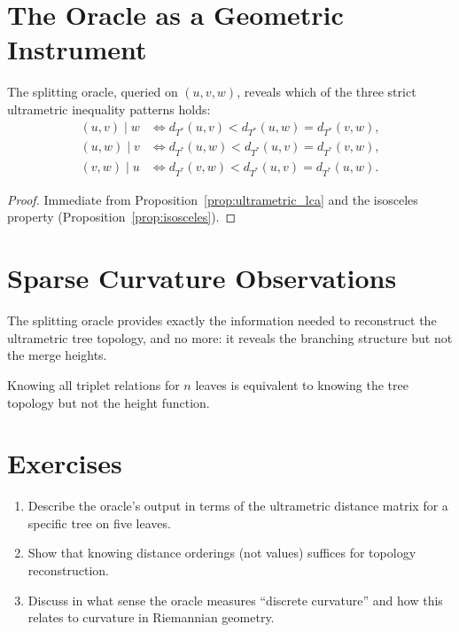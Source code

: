 \section{The Oracle as a Geometric Instrument}

\begin{theorem}
The splitting oracle, queried on $(u,v,w)$, reveals which of the three strict ultrametric inequality patterns holds:
\begin{align*}
(u,v) \mid w &\iff d_{T^*}(u,v) < d_{T^*}(u,w) = d_{T^*}(v,w),\\
(u,w) \mid v &\iff d_{T^*}(u,w) < d_{T^*}(u,v) = d_{T^*}(v,w),\\
(v,w) \mid u &\iff d_{T^*}(v,w) < d_{T^*}(u,v) = d_{T^*}(u,w).
\end{align*}
\end{theorem}

\begin{proof}
Immediate from Proposition~\ref{prop:ultrametric_lca} and the isosceles property (Proposition~\ref{prop:isosceles}).
\end{proof}

\section{Sparse Curvature Observations}

\begin{corollary}
The splitting oracle provides exactly the information needed to reconstruct the ultrametric tree topology, and no more: it reveals the branching structure but not the merge heights.
\end{corollary}

Knowing all triplet relations for $n$ leaves is equivalent to knowing the tree topology but not the height function.

\section{Exercises}

\begin{enumerate}
  \item Describe the oracle's output in terms of the ultrametric distance matrix for a specific tree on five leaves.
  \item Show that knowing distance orderings (not values) suffices for topology reconstruction.
  \item Discuss in what sense the oracle measures ``discrete curvature'' and how this relates to curvature in Riemannian geometry.
\end{enumerate}
